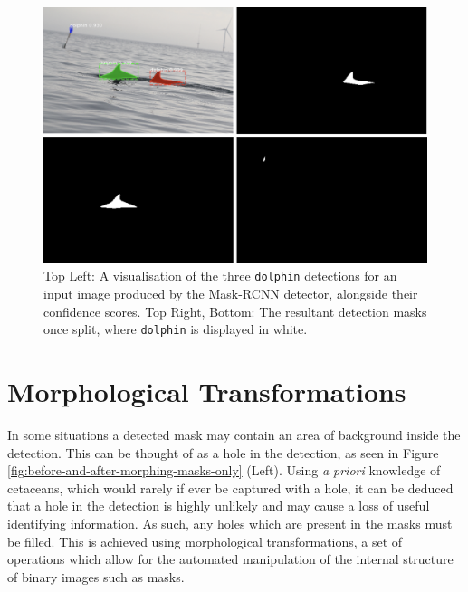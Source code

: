 \begin{figure}[h]
	\begin{center}
		\includegraphics[scale=0.5]{Chapter4/figs/190730-001-MOLS0360_-detections.png}
	\end{center}
	\caption{Top Left: A visualisation of the three \texttt{dolphin} detections for an input image produced by the Mask-RCNN detector, alongside their confidence scores. Top Right, Bottom: The resultant detection masks once split, where \texttt{dolphin} is displayed in white.}
	\label{fig:190730-001-MOLS0360_-detections}
\end{figure}


\section{Morphological Transformations}\label{ch:postProcessing,sec:morphologicalTransformations}

In some situations a detected mask may contain an area of background inside the detection. This can be thought of as a hole in the detection, as seen in Figure \ref{fig:before-and-after-morphing-masks-only} (Left). Using \textit{a priori} knowledge of cetaceans, which would rarely if ever be captured with a hole, it can be deduced that a hole in the detection is highly unlikely and may cause a loss of useful identifying information. As such, any holes which are present in the masks must be filled. This is achieved using morphological transformations, a set of operations which allow for the automated manipulation of the internal structure of binary images such as masks. 

